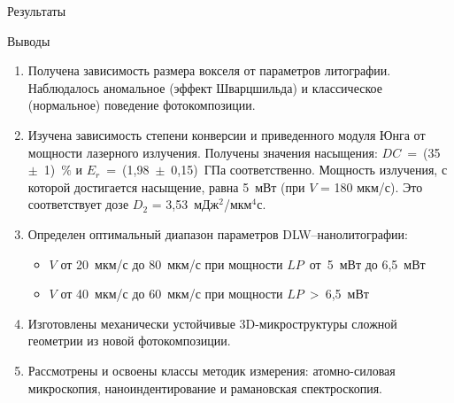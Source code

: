 \documentclass[aspectratio=169]{beamer}
\begin{document}
\begin{frame}{Результаты}
\begin{minipage}{0.35\linewidth}
        \end{minipage}
\end{frame}

\begin{frame}{Выводы}
    \begin{enumerate}
            \item Получена зависимость размера вокселя от параметров литографии. Наблюдалось аномальное (эффект Шварцшильда) и классическое (нормальное) поведение фотокомпозиции.
            \item Изучена зависимость степени конверсии и приведенного модуля Юнга от мощности лазерного излучения. Получены значения насыщения: $DC$~=~(35~$\pm$~1)~$\%$ и $E_r$~=~(1,98~$\pm$~0,15)~ГПа соответственно. Мощность излучения, с которой достигается насыщение, равна 5~мВт (при $V$ = 180 мкм/с). Это соответствует дозе $D_2$ = 3,53~мДж$^2$/мкм$^4$с.
            \item Определен оптимальный диапазон параметров DLW--нанолитографии:
            \begin{itemize}
                \item $V$ от 20~мкм/с до 80~мкм/с при мощности  $LP$~от~5~мВт до 6,5~мВт
                \item $V$ от 40~мкм/с до 60~мкм/с при мощности  $LP$~>~6,5~мВт 
            \end{itemize}
            \item Изготовлены механически устойчивые 3D-микроструктуры сложной геометрии из новой фотокомпозиции.
            \item Рассмотрены и освоены классы методик измерения: атомно-силовая микроскопия, наноиндентирование и рамановская спектроскопия.
        \end{enumerate}
\end{frame}
\end{document}
